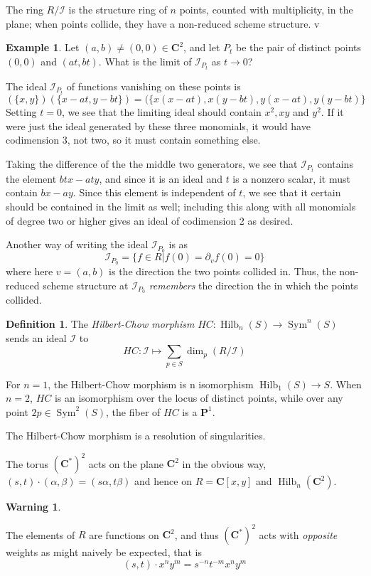 \documentclass{amsart}[12pt]
\theoremstyle{definition}
\newtheorem{example}[dummy]{Example}
\newtheorem{definition}[dummy]{Definition}
\newtheorem{warning}[dummy]{Warning}
\newcommand{\C}{\mathbf{C}}
\newcommand{\proj}{\mathbf{P}}
\DeclareMathOperator{\Hilb}{Hilb}
\DeclareMathOperator{\Sym}{Sym}
\begin{document}
The ring $R/\mathcal{I}$ is the structure ring of $n$ points, counted with multiplicity, in the plane; when points collide, they have a non-reduced scheme structure.  
v
\begin{example}
Let $(a,b)\neq (0,0)\in\C^2$, and let $P_t$ be the pair of distinct points $(0,0)$ and $(at,bt)$.  What is the limit of $\mathcal{I}_{P_t}$ as $t\to 0$?


The ideal $\mathcal{I}_{P_t}$ of functions vanishing on these points is 
$$(\{x,y\})(\{x-at,y-bt\})=(\{x(x-at),x(y-bt), y(x-at), y(y-bt)\}$$
Setting $t=0$, we see that the limiting ideal should contain $x^2, xy$ and $y^2$.  If it were just the ideal generated by these three monomials, it would have codimension 3, not two, so it must contain something else.

Taking the difference of the the middle two generators, we see that $\mathcal{I}_{P_t}$ contains the element $btx-aty$, and since it is an ideal and $t$ is a nonzero scalar, it must contain $bx-ay$.  Since this element is independent of $t$, we see that it certain should be contained in the limit as well; including this along with all monomials of degree two or higher gives an ideal of codimension 2 as desired.

Another way of writing the ideal $\mathcal{I}_{P_0}$ is as 
$$\mathcal{I}_{P_0}=\{f\in R| f(0)=\partial_vf(0)=0\}$$
where here $v=(a,b)$ is the direction the two points collided in.  Thus, the non-reduced scheme structure at $\mathcal{I}_{P_0}$ \emph{remembers} the direction the in which the points collided. 
\end{example}

\begin{definition}
The \emph{Hilbert-Chow morphism} $HC:\Hilb_n(S)\to\Sym^n(S)$ sends an ideal $\mathcal{I}$ to 
$$HC:\mathcal{I}\mapsto \sum_{p\in S} \dim_p (R/\mathcal{I})$$
\end{definition}


For $n=1$, the Hilbert-Chow morphism is n isomorphism $\Hilb_1(S)\to S$.  When $n=2$, $HC$ is an isomorphism over the locus of distinct points, while over any point $2p\in\Sym^2(S)$, the fiber of $HC$ is a $\proj^1$.

The Hilbert-Chow morphism is a resolution of singularities.


The torus $(\C^*)^2$ acts on the plane $\C^2$ in the obvious way, $(s,t)\cdot (\alpha,\beta)=(s\alpha,t\beta)$ and hence on $R=\C[x,y]$ and $\Hilb_n(\C^2)$.  

\begin{warning} \label{warning:action-sign}

 The elements of $R$ are functions on $\C^2$, and thus $(\C^*)^2$ acts with \emph{opposite} weights as might naively be expected, that is 
$$(s,t)\cdot x^ny^m=s^{-n}t^{-m}x^ny^m$$

\end{warning}
\end{document}
